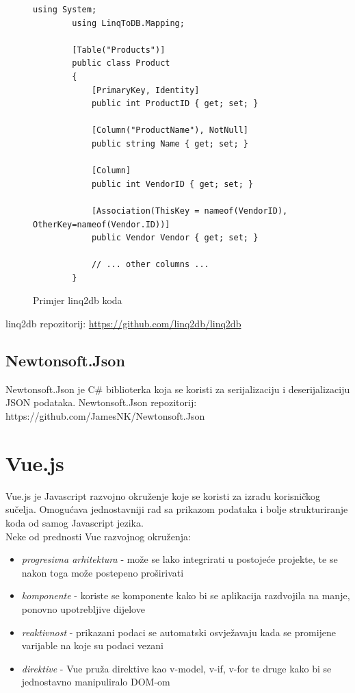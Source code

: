 \documentclass[zavrsnirad]{fer}
\begin{document}
\begin{figure}[htp]
	\centering
	\begin{lstlisting}[language=CSharp]
		using System;
		using LinqToDB.Mapping;
		
		[Table("Products")]
		public class Product
		{
			[PrimaryKey, Identity]
			public int ProductID { get; set; }
			
			[Column("ProductName"), NotNull]
			public string Name { get; set; }
			
			[Column]
			public int VendorID { get; set; }
			
			[Association(ThisKey = nameof(VendorID), OtherKey=nameof(Vendor.ID))]
			public Vendor Vendor { get; set; }
			
			// ... other columns ...
		}
	\end{lstlisting}
	\caption{Primjer linq2db koda}
\end{figure}
\FloatBarrier

linq2db repozitorij: \url{https://github.com/linq2db/linq2db}

\subsection{Newtonsoft.Json}
Newtonsoft.Json je C\# biblioterka koja se koristi za serijalizaciju i deserijalizaciju JSON podataka.
Newtonsoft.Json repozitorij: https://github.com/JamesNK/Newtonsoft.Json

\section{Vue.js}
\label{pog:vue}
Vue.js je Javascript razvojno okruženje koje se koristi za izradu korisničkog sučelja. Omogućava jednostavniji rad sa prikazom podataka i bolje strukturiranje koda od samog Javascript jezika.
\\Neke od prednosti Vue razvojnog okruženja:
\begin{itemize}
	\item \textit{progresivna arhitektura} - može se lako integrirati u postojeće projekte, te se nakon toga može postepeno proširivati
	\item \textit{komponente} - koriste se komponente kako bi se aplikacija razdvojila na manje, ponovno upotrebljive dijelove
	\item \textit{reaktivnost} - prikazani podaci se automatski osvježavaju kada se promijene varijable na koje su podaci vezani
	\item \textit{direktive} - Vue pruža direktive kao v-model, v-if, v-for te druge kako bi se jednostavno manipuliralo DOM-om
\end{itemize}
\end{document}
